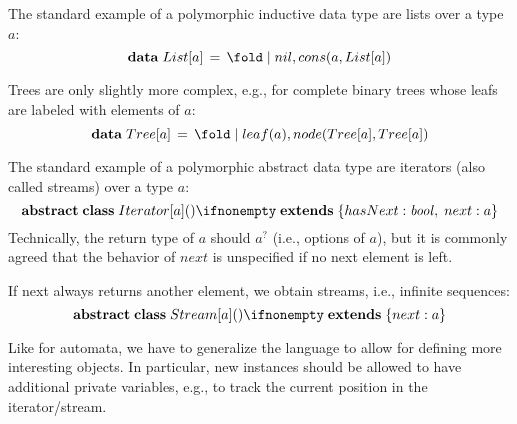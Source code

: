 \begin{commgrammar}
\\
\\
\\
\\
\\
\\
\\
\\
\\
\\
\\
\\
\\
\\
\\
\end{commgrammar}

\begin{example}
The standard example of a polymorphic inductive data type are lists over a type $a$:
\[\adata{List[a]}{nil,{cons(a,List[a])}}\]

Trees are only slightly more complex, e.g., for complete binary trees whose leafs are labeled with elements of $a$:
\[\adata{Tree[a]}{leaf(a),{node(Tree[a],Tree[a])}}\]
\end{example}

\begin{example}
The standard example of a polymorphic abstract data type are iterators (also called streams) over a type $a$:
\[\aclassAI{Iterator[a]}{}{}{hasNext:\Bool,\;next:a}\]
Technically, the return type of $a$ should $a^?$ (i.e., options of $a$), but it is commonly agreed that the behavior of $next$ is unspecified if no next element is left.

If next always returns another element, we obtain streams, i.e., infinite sequences:
\[\aclassAI{Stream[a]}{}{}{next:a}\]

Like for automata, we have to generalize the language to allow for defining more interesting objects.
In particular, new instances should be allowed to have additional private variables, e.g., to track the current position in the iterator/stream.
\end{example}

